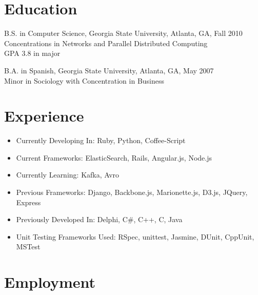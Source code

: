 \documentclass[margin]{res}
\begin{document}

\address{204 Drexel Ave Apt B \\ Decatur, GA 30030  \\
        (678) 773-1545 }

\begin{resume}

\section{Education}
    B.S. in Computer Science, Georgia State University, Atlanta, GA, Fall 2010  \\
    Concentrations in Networks and Parallel Distributed Computing \\
    GPA 3.8 in major

    B.A. in Spanish, Georgia State University, Atlanta, GA, May 2007 \\
    Minor in Sociology with Concentration in Business


\section{Experience}
    \begin{itemize} \itemsep -2pt  %
        \item Currently Developing In: Ruby, Python, Coffee-Script
        \item Current Frameworks: ElasticSearch, Rails, Angular.js, Node.js
        \item Currently Learning: Kafka, Avro
        \item Previous Frameworks: Django, Backbone.js, Marionette.js, D3.js, JQuery, Express
        \item Previously Developed In: Delphi, C\#, C++, C, Java
        \item Unit Testing Frameworks Used: RSpec, unittest, Jasmine, DUnit, CppUnit, MSTest
    \end{itemize}

\section{Employment}


\end{resume}
\end{document}

